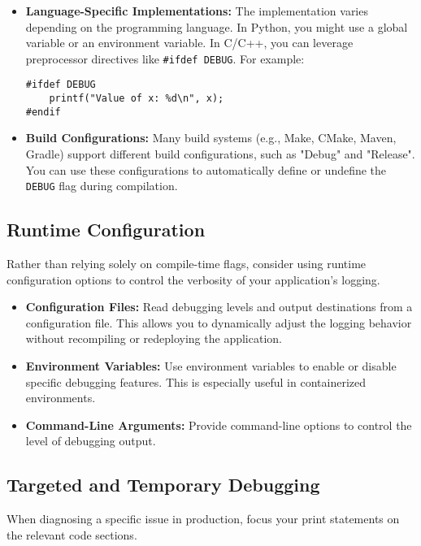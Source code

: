 \documentclass{article}
\begin{document}
\begin{itemize}
    \item \textbf{Language-Specific Implementations:} The implementation varies depending on the programming language. In Python, you might use a global variable or an environment variable. In C/C++, you can leverage preprocessor directives like \texttt{\#ifdef DEBUG}.  For example:

\begin{verbatim}
#ifdef DEBUG
    printf("Value of x: %d\n", x);
#endif
\end{verbatim}

    \item \textbf{Build Configurations:}  Many build systems (e.g., Make, CMake, Maven, Gradle) support different build configurations, such as "Debug" and "Release".  You can use these configurations to automatically define or undefine the \texttt{DEBUG} flag during compilation.
\end{itemize}

\subsection*{Runtime Configuration}

Rather than relying solely on compile-time flags, consider using runtime configuration options to control the verbosity of your application's logging.

\begin{itemize}
    \item \textbf{Configuration Files:} Read debugging levels and output destinations from a configuration file.  This allows you to dynamically adjust the logging behavior without recompiling or redeploying the application.
    \item \textbf{Environment Variables:} Use environment variables to enable or disable specific debugging features.  This is especially useful in containerized environments.
    \item \textbf{Command-Line Arguments:}  Provide command-line options to control the level of debugging output.
\end{itemize}

\subsection*{Targeted and Temporary Debugging}

When diagnosing a specific issue in production, focus your print statements on the relevant code sections.
\end{document}
